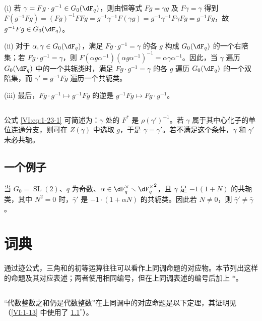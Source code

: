 (i) 若 $\gamma= F g\cdot g^{-1}\in G_0(\dF_q)$，则由恒等式 $F g=\gamma g$ 及 $F\gamma=\gamma$ 得到 $F(g^{-1} F g) = (F g)^{-1} F F g = g^{-1} \gamma^{-1} F(\gamma g) = g^{-1} \gamma^{-1} F \gamma F g = g^{-1} F g$，故 $g^{-1} F g \in G_0(\dF_q)$。

(ii) 对于 $\alpha,\gamma\in G_0(\dF_q)$，满足 $F g\cdot g^{-1} = \gamma$ 的各 $g$ 构成 $G_0(\dF_q)$ 的一个右陪集；若 $F g\cdot g^{-1} = \gamma$，则 $F(\alpha g \alpha^{-1})(\alpha g \alpha^{-1})^{-1} = \alpha \gamma\alpha^{-1}$。因此，当 $\gamma$ 遍历 $G_0(\dF_q)$ 中的一个共轭类时，满足 $F g\cdot g^{-1} = \gamma$ 的各 $g$ 遍历 $G_0(\dF_q)$ 的一个双陪集，而 $\gamma'= g^{-1} F g$ 遍历一个共轭类。

(iii) 最后，$F g\cdot g^{-1}\mapsto g^{-1} F g$ 的逆是 $g^{-1} F g\mapsto F g\cdot g^{-1}$。

\subsection{}\label{VI:1-25}

公式 \eqref{VI:eq:1-23-1} 可简述为：$\gamma$ 处的 $F^\ast$ 是 $\rho(\gamma')^{-1}$。若 $\gamma$ 属于其中心化子的单位连通分支，则可在 $Z(\gamma)$ 中选取 $g$，于是 $\gamma=\gamma'$。若不满足这个条件，$\gamma$ 和 $\gamma'$ 未必共轭。

\subsection{一个例子}\label{VI:1-26}

当 $G_0=\operatorname{SL}(2)$、$q$ 为奇数、$\alpha\in \dF_q^\times\setminus {\dF_q^\times}^2$，且 $\bar\gamma$ 是 $-1(1+N)$ 的共轭类，其中 $N^2=0$ 时，$\bar\gamma'$ 是 $-1\cdot (1+\alpha N)$ 的共轭类。因此若 $N\ne 0$，则 $\bar\gamma'\ne \bar\gamma$。

\section{词典}\label{VI:2}

通过迹公式，三角和的初等运算往往可以看作上同调命题的对应物。本节列出这样的命题及其对应表述；两者使用相同编号，但在上同调表述的编号后加上 $\ast$。

\subsection{}\label{VI:2-1}

“代数整数之和仍是代数整数”在上同调中的对应命题是以下定理，其证明见 \cite[XXI 5.2.2]{sga7}（\ref{VI:1-13} 中使用了 \ref{VI:2-1}$^\ast$）。

